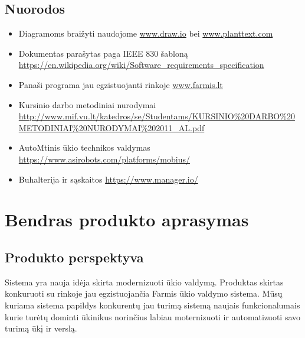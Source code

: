 \documentclass[oneside]{VUMIFPSkursinis}
\begin{document}
\subsection{Nuorodos}
\begin{itemize}
	\item Diagramoms braižyti naudojome \url{www.draw.io} bei \url{www.planttext.com}
	\item Dokumentas parašytas paga IEEE 830 šabloną \url{https://en.wikipedia.org/wiki/Software_requirements_specification}
	\item Panaši programa jau egzistuojanti rinkoje \url{www.farmis.lt}
	\item Kursinio darbo metodiniai nurodymai \url{http://www.mif.vu.lt/katedros/se/Studentams/KURSINIO%20DARBO%20METODINIAI%20NURODYMAI%202011_AL.pdf}
	\item AutoMtinis ūkio technikos valdymas \url{https://www.asirobots.com/platforms/mobius/}
	\item Buhalterija ir sąskaitos \url{https://www.manager.io/}
\end{itemize}

\section{Bendras produkto aprasymas}
\subsection{Produkto perspektyva}
Sistema yra nauja idėja skirta modernizuoti ūkio valdymą. Produktas skirtas konkuruoti su rinkoje jau egzistuojančia Farmis ūkio valdymo sistema. Mūsų kuriama sistema papildys konkurentų jau turimą sistemą naujais funkcionalumais kurie turėtų dominti ūkinikus norinčius labiau moternizuoti ir automatizuoti savo turimą ūkį ir verslą. 
\end{document}
